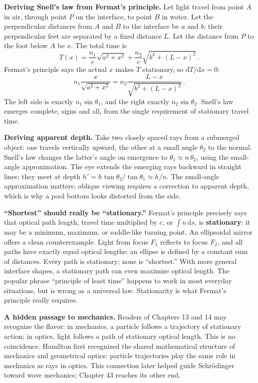 \begin{mathbridge}
\textbf{Deriving Snell's law from Fermat's principle.} Let light travel from point \(A\) in air, through point \(P\) on the interface, to point \(B\) in water. Let the perpendicular distances from \(A\) and \(B\) to the interface be \(a\) and \(b\); their perpendicular feet are separated by a fixed distance \(L\). Let the distance from \(P\) to the foot below \(A\) be \(x\). The total time is
\[
T(x)=\frac{n_1}{c}\sqrt{a^2+x^2}+\frac{n_2}{c}\sqrt{b^2+(L-x)^2}\,.
\]
Fermat's principle says the actual \(x\) makes \(T\) stationary, so \(\mathrm{d}T/\mathrm{d}x=0\):
\[
n_1\frac{x}{\sqrt{a^2+x^2}}=n_2\frac{L-x}{\sqrt{b^2+(L-x)^2}}\,.
\]
The left side is exactly \(n_1\sin\theta_1\), and the right exactly \(n_2\sin\theta_2\). Snell's law emerges complete, signs and all, from the single requirement of stationary travel time.

\textbf{Deriving apparent depth.} Take two closely spaced rays from a submerged object: one travels vertically upward, the other at a small angle \(\theta_2\) to the normal. Snell's law changes the latter's angle on emergence to \(\theta_1\approx n\,\theta_2\), using the small-angle approximation. The eye extends the emerging rays backward in straight lines; they meet at depth \(h'=h\tan\theta_2/\tan\theta_1\approx h/n\). The small-angle approximation matters: oblique viewing requires a correction to apparent depth, which is why a pool bottom looks distorted from the side.
\end{mathbridge}

\begin{challenge}
\textbf{``Shortest'' should really be ``stationary.''} Fermat's principle precisely says that optical path length, travel time multiplied by \(c\), or \(\int n\,\mathrm{d}s\), is \textbf{stationary}: it may be a minimum, maximum, or saddle-like turning point. An ellipsoidal mirror offers a clean counterexample. Light from focus \(F_1\) reflects to focus \(F_2\), and all paths have exactly equal optical lengths: an ellipse is defined by a constant sum of distances. Every path is stationary; none is ``shortest.'' With more general interface shapes, a stationary path can even maximize optical length. The popular phrase ``principle of least time'' happens to work in most everyday situations, but is wrong as a universal law. Stationarity is what Fermat's principle really requires.

\textbf{A hidden passage to mechanics.} Readers of Chapters 13 and 14 may recognize the flavor: in mechanics, a particle follows a trajectory of stationary action; in optics, light follows a path of stationary optical length. This is no coincidence. Hamilton first recognized the shared mathematical structure of mechanics and geometrical optics: particle trajectories play the same role in mechanics as rays in optics. This connection later helped guide Schrödinger toward wave mechanics; Chapter 43 reaches its other end.
\end{challenge}

